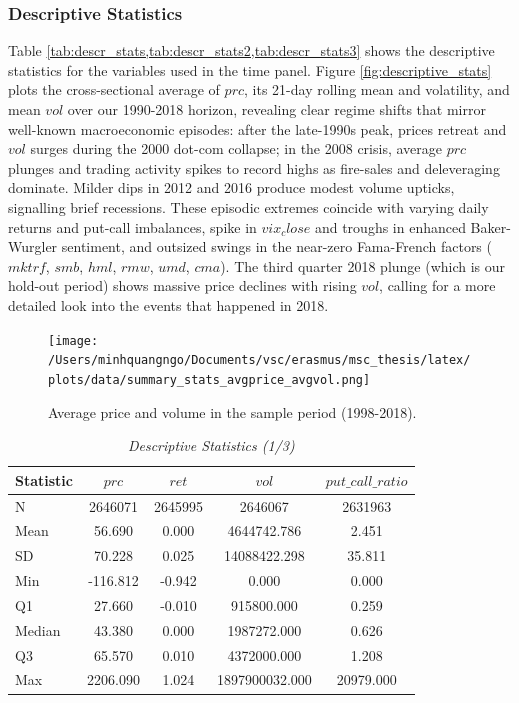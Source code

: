 \subsubsection{Descriptive Statistics}
Table \cref{tab:descr_stats,tab:descr_stats2,tab:descr_stats3} shows the descriptive statistics for the variables used in the time panel. Figure \ref{fig:descriptive_stats} plots the cross-sectional average of $prc$, its 21-day rolling mean and volatility, and mean $vol$ over our 1990-2018 horizon, revealing clear regime shifts that mirror well-known macroeconomic episodes: after the late-1990s peak, prices retreat and $vol$ surges during the 2000 dot-com collapse; in the 2008 crisis, average $prc$ plunges and trading activity spikes to record highs as fire-sales and deleveraging dominate. Milder dips in 2012 and 2016 produce modest volume upticks, signalling brief recessions. These episodic extremes coincide with varying daily returns and put-call imbalances, spike in $vix_close$ and troughs in enhanced Baker-Wurgler sentiment, and outsized swings in the near-zero Fama-French factors ($mktrf$, $smb$, $hml$, $rmw$, $umd$, $cma$). The third quarter 2018 plunge (which is our hold-out period) shows massive price declines with rising $vol$, calling for a more detailed look into the events that happened in 2018. 


\begin{figure}[H]
    \centering
    \texttt{[image: /Users/minhquangngo/Documents/vsc/erasmus/msc\_thesis/latex/plots/data/summary\_stats\_avgprice\_avgvol.png]}
    \caption{Average price and volume in the sample period (1998-2018).}
    \label{fig:avgprice_avgvol}
\end{figure}

\begin{table}[H]
  \centering
  \caption{\textit{Descriptive Statistics (1/3)}}
  \label{tab:descr_stats}
  
  \begin{tabular}{lcccc}
  \toprule
  Statistic & $prc$ & $ret$ & $vol$ & $put\_call\_ratio$ \\\midrule
  N & 2646071 & 2645995 & 2646067 & 2631963 \\
  Mean & 56.690 & 0.000 & 4644742.786 & 2.451 \\
  SD & 70.228 & 0.025 & 14088422.298 & 35.811 \\
  Min & -116.812 & -0.942 & 0.000 & 0.000 \\
  Q1 & 27.660 & -0.010 & 915800.000 & 0.259 \\
  Median & 43.380 & 0.000 & 1987272.000 & 0.626 \\
  Q3 & 65.570 & 0.010 & 4372000.000 & 1.208 \\
  Max & 2206.090 & 1.024 & 1897900032.000 & 20979.000 \\
  \bottomrule
  \end{tabular}
  \end{table}
  
